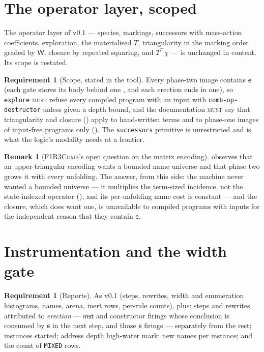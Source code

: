 \documentclass[11pt,a4paper]{article}
\newcommand{\code}[1]{\texttt{#1}}
\newcommand{\Comb}{\textsc{F1R3Comb}}
\newcommand{\MUST}{\textsc{must}}
\newcommand{\ev}{\mathsf{e}}
\newcommand{\Wt}{\mathsf{W}}
\theoremstyle{definition}
\newtheorem{requirement}[definition]{Requirement}
\newtheorem{remark}[definition]{Remark}
\theoremstyle{plain}
\newcommand{\inst}{\mathsf{inst}}
\begin{document}
\section{The operator layer, scoped}\label{sec:op}

The operator layer of v0.1 --- species, markings, successors with
mass-action coefficients, exploration, the materialised $T$, triangularity in
the marking order graded by $\Wt$, closure by repeated squaring, and
$T^{\top}\chi$ --- is unchanged in content. Its scope is restated.

\begin{requirement}[Scope, stated in the tool]\label{req:opscope}
Every phase-two image contains $\ev$ (each gate stores its body behind one
\cite[Lem.~6.2]{draft3}, and each erection ends in one), so
\code{explore} \MUST{} refuse every compiled program with an input with
\code{comb-op-destructor} unless given a depth bound, and the documentation
\MUST{} say that triangularity and closure
(\cite[Thm.~6.1(ii), Cor.~6.2]{matnote}) apply to hand-written terms and to
phase-one images of input-free programs only (\cite[\S14.2]{matnote}). The
\code{successors} primitive is unrestricted and is what the logic's modality
needs at a frontier.
\end{requirement}

\begin{remark}[\Comb's open question on the matrix encoding]
\cite[\S15, item~5]{combspec} observes that an upper-triangular encoding wants
a bounded name universe and that phase two grows it with every unfolding. The
answer, from this side: the machine never wanted a bounded universe --- it
multiplies the term-sized incidence, not the state-indexed operator
(\cite[\S7]{matnote}), and its per-unfolding name cost is constant --- and the
closure, which does want one, is unavailable to compiled programs with inputs
for the independent reason that they contain $\ev$.
\end{remark}

\section{Instrumentation and the width gate}\label{sec:instr}

\begin{requirement}[Reports]\label{req:reports}
As v0.1 (steps, rewrites, width and enumeration histograms, names, arena,
inert rows, per-rule counts), plus: steps and rewrites attributed to
\emph{erection} --- $\inst$ and constructor firings whose conclusion is
consumed by $\ev$ in the next step, and those $\ev$ firings --- separately
from the rest; instances started; address depth high-water mark; new names per
instance; and the count of \code{MIXED} rows.
\end{requirement}
\end{document}
